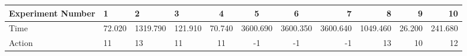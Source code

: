 \documentclass[8pt]{article}
\begin{document}
\begin{landscape}
\begin{tabular}{ | l | l | l | l | c | c | c | r | r | r | r | }
 \hline 
Experiment Number & 1 & 2 & 3 & 4 & 5 & 6 & 7 & 8 & 9 & 10\\ \hline
Time & 72.020 & 1319.790 & 121.910 & 70.740 & 3600.690 & 3600.350 & 3600.640 & 1049.460 & 26.200 & 241.680\\ \hline
Action & 11 & 13 & 11 & 11 & -1 & -1 & -1 & 13 & 10 & 12\\ \hline\end{tabular}
\end{landscape}
\end{document}

